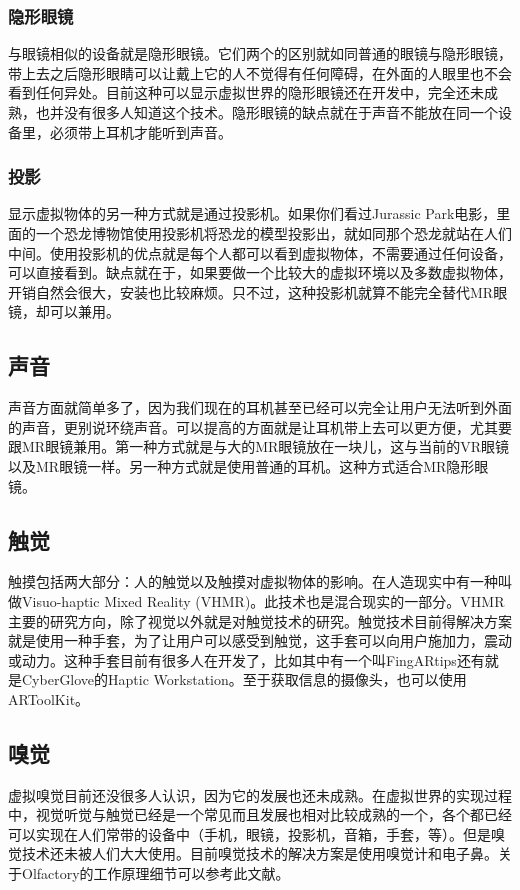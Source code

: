 \documentclass{llncs}
\begin{document}
\subsubsection{隐形眼镜}
与眼镜相似的设备就是隐形眼镜。它们两个的区别就如同普通的眼镜与隐形眼镜，带上去之后隐形眼睛可以让戴上它的人不觉得有任何障碍，在外面的人眼里也不会看到任何异处。目前这种可以显示虚拟世界的隐形眼镜还在开发中，完全还未成熟，也并没有很多人知道这个技术。隐形眼镜的缺点就在于声音不能放在同一个设备里，必须带上耳机才能听到声音。

\subsubsection{投影}
显示虚拟物体的另一种方式就是通过投影机。如果你们看过Jurassic Park电影，里面的一个恐龙博物馆使用投影机将恐龙的模型投影出，就如同那个恐龙就站在人们中间。使用投影机的优点就是每个人都可以看到虚拟物体，不需要通过任何设备，可以直接看到。缺点就在于，如果要做一个比较大的虚拟环境以及多数虚拟物体，开销自然会很大，安装也比较麻烦。只不过，这种投影机就算不能完全替代MR眼镜，却可以兼用。

\subsection{声音}
声音方面就简单多了，因为我们现在的耳机甚至已经可以完全让用户无法听到外面的声音，更别说环绕声音。可以提高的方面就是让耳机带上去可以更方便，尤其要跟MR眼镜兼用。第一种方式就是与大的MR眼镜放在一块儿，这与当前的VR眼镜以及MR眼镜一样。另一种方式就是使用普通的耳机。这种方式适合MR隐形眼镜。

\subsection{触觉}
触摸包括两大部分：人的触觉以及触摸对虚拟物体的影响。在人造现实中有一种叫做Visuo-haptic Mixed Reality (VHMR)。此技术也是混合现实的一部分。VHMR主要的研究方向，除了视觉以外就是对触觉技术的研究。触觉技术目前得解决方案就是使用一种手套，为了让用户可以感受到触觉，这手套可以向用户施加力，震动或动力。这种手套目前有很多人在开发了，比如其中有一个叫FingARtips\cite{buchmann2004fingartips}还有就是CyberGlove的Haptic Workstation\cite{DBLP:journals/vc/OttTV07}。至于获取信息的摄像头，也可以使用ARToolKit\cite{DBLP:journals/tvcg/CoscoGBMO13}。

\subsection{嗅觉}
虚拟嗅觉目前还没很多人认识，因为它的发展也还未成熟。在虚拟世界的实现过程中，视觉听觉与触觉已经是一个常见而且发展也相对比较成熟的一个，各个都已经可以实现在人们常带的设备中（手机，眼镜，投影机，音箱，手套，等）。但是嗅觉技术还未被人们大大使用。目前嗅觉技术的解决方案是使用嗅觉计和电子鼻。关于Olfactory的工作原理细节可以参考此文献\cite{firestein2001olfactory}。
\end{document}
